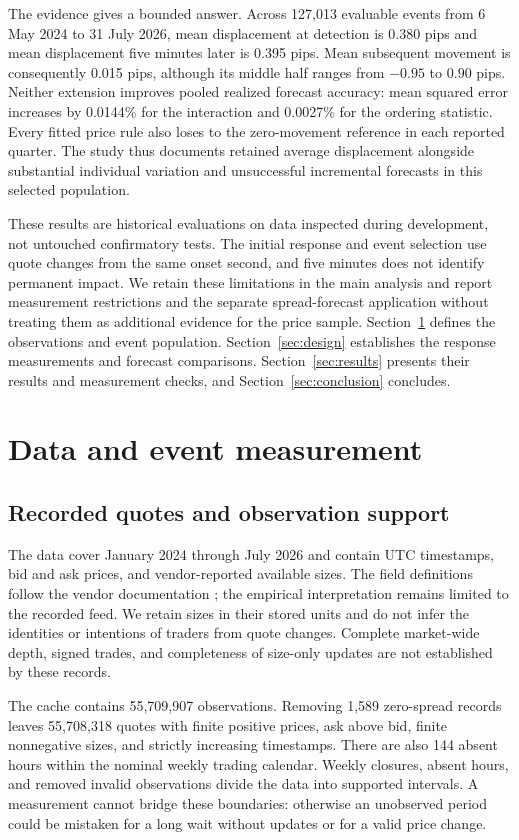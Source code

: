 \documentclass[12pt,letterpaper]{article}
\begin{document}
The evidence gives a bounded answer. Across 127,013 evaluable events from 6 May 2024 to 31 July 2026, mean displacement at detection is 0.380 pips and mean displacement five minutes later is 0.395 pips. Mean subsequent movement is consequently 0.015 pips, although its middle half ranges from $-0.95$ to $0.90$ pips. Neither extension improves pooled realized forecast accuracy: mean squared error increases by 0.0144\% for the interaction and 0.0027\% for the ordering statistic. Every fitted price rule also loses to the zero-movement reference in each reported quarter. The study thus documents retained average displacement alongside substantial individual variation and unsuccessful incremental forecasts in this selected population.

These results are historical evaluations on data inspected during development, not untouched confirmatory tests. The initial response and event selection use quote changes from the same onset second, and five minutes does not identify permanent impact. We retain these limitations in the main analysis and report measurement restrictions and the separate spread-forecast application without treating them as additional evidence for the price sample. Section~\ref{sec:data} defines the observations and event population. Section~\ref{sec:design} establishes the response measurements and forecast comparisons. Section~\ref{sec:results} presents their results and measurement checks, and Section~\ref{sec:conclusion} concludes.

\section{Data and event measurement}\label{sec:data}
\subsection{Recorded quotes and observation support}
The data cover January 2024 through July 2026 and contain UTC timestamps, bid and ask prices, and vendor-reported available sizes. The field definitions follow the vendor documentation \citep{dukascopyITick}; the empirical interpretation remains limited to the recorded feed. We retain sizes in their stored units and do not infer the identities or intentions of traders from quote changes. Complete market-wide depth, signed trades, and completeness of size-only updates are not established by these records.

The cache contains 55,709,907 observations. Removing 1,589 zero-spread records leaves 55,708,318 quotes with finite positive prices, ask above bid, finite nonnegative sizes, and strictly increasing timestamps. There are also 144 absent hours within the nominal weekly trading calendar. Weekly closures, absent hours, and removed invalid observations divide the data into supported intervals. A measurement cannot bridge these boundaries: otherwise an unobserved period could be mistaken for a long wait without updates or for a valid price change.
\end{document}
